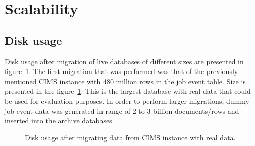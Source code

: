 

\section{Scalability}
\subsection{Disk usage}
Disk usage after migration of live databases of different sizes are presented in figure~\ref{fig:disc}. 
The first migration that was performed was that of the previously mentioned CIMS instance with 480 million rows in the job event table. Size is presented in the figure~\ref{fig:disc}. This is the largest database with real data that could be used for evaluation purposes. In order to perform larger migrations, dummy job event data was generated in range of 2 to 3 billion documents/rows and inserted into the archive databases.
\begin{figure}[h!]
\centering
{}
\caption{Disk usage after migrating data from CIMS instance with real data.}
\label{fig:disc}
\end{figure}

